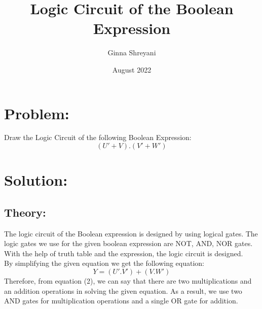 \documentclass[a4paper,12pt,twocolumn]{article}
\title{Logic Circuit of the Boolean Expression}
\author{Ginna Shreyani}
\date{August 2022}
\begin{document}
\maketitle

\section{Problem:}
Draw the Logic Circuit of the following Boolean Expression:\\
\begin{equation} (U'+V).(V'+W')\end{equation}
\maketitle
\section{Solution:}
\subsection{Theory:}
The logic circuit of the Boolean expression is designed by using logical gates. The logic gates we use for the given boolean expression are NOT, AND, NOR gates. With the help of truth table and the expression, the logic circuit is designed. \\
By simplifying the given equation we get the
following equation:\\
\begin{equation} Y=(U'.V')+(V.W')\end{equation}
Therefore, from equation (2), we can say that
there are two multiplications and an addition
operations in solving the given equation. As a
result, we use two AND gates for multiplication
operations and a single OR gate for addition.
\end{document}
